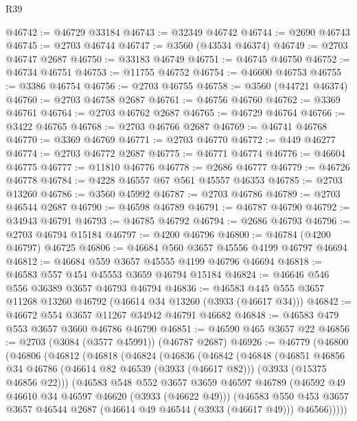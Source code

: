 \begin{lexlean}{R39}
\begin{coremodule}
@46742 := @46729 @33184
@46743 := @32349 @46742
@46744 := @2690 @46743
@46745 := @2703 @46744
@46747 := @3560 (@43534 @46374)
@46749 := @2703 @46747 @2687
@46750 := @33183 @46749
@46751 := @46745 @46750
@46752 := @46734 @46751
@46753 := @11755 @46752
@46754 := @46600 @46753
@46755 := @3386 @46754
@46756 := @2703 @46755
@46758 := @3560 (@44721 @46374)
@46760 := @2703 @46758 @2687
@46761 := @46756 @46760
@46762 := @3369 @46761
@46764 := @2703 @46762 @2687
@46765 := @46729 @46764
@46766 := @3422 @46765
@46768 := @2703 @46766 @2687
@46769 := @46741 @46768
@46770 := @3369 @46769
@46771 := @2703 @46770
@46772 := @449 @46277
@46774 := @2703 @46772 @2687
@46775 := @46771 @46774
@46776 := @46604 @46775
@46777 := @11810 @46776
@46778 := @2686 @46777
@46779 := @46726 @46778
@46784 := @4228 @46557 @67 @561 @45557 @46353
@46785 := @2703 @13260
@46786 := @3560 @45992
@46787 := @2703 @46786
@46789 := @2703 @46544 @2687
@46790 := @46598 @46789
@46791 := @46787 @46790
@46792 := @34943 @46791
@46793 := @46785 @46792
@46794 := @2686 @46793
@46796 := @2703 @46794 @15184
@46797 := @4200 @46796
@46800 := @46784 (@4200 @46797) @46725
@46806 := @46684 @560 @3657 @45556 @4199 @46797 @46694
@46812 := @46684 @559 @3657 @45555 @4199 @46796 @46694
@46818 := @46583 @557 @454 @45553 @3659 @46794 @15184
@46824 := @46646 @546 @556 @36389 @3657 @46793 @46794
@46836 := @46583 @445 @555 @3657 @11268 @13260 @46792 (@46614 @34 @13260 (@3933 (@46617 @34)))
@46842 := @46672 @554 @3657 @11267 @34942 @46791 @46682
@46848 := @46583 @479 @553 @3657 @3660 @46786 @46790
@46851 := @46590 @465 @3657 @22
@46856 := @2703 (@3084 (@3577 @45991)) (@46787 @2687)
@46926 := @46779
    (@46800
      (@46806
        (@46812
          (@46818
            (@46824
              (@46836
                (@46842
                  (@46848
                    (@46851
                      @46856
                      @34
                      @46786
                      (@46614 @82 @46539 (@3933 (@46617 @82)))
                      (@3933 (@15375 @46856 @22)))
                    (@46583
                      @548
                      @552
                      @3657
                      @3659
                      @46597
                      @46789
                      (@46592 @49 @46610 @34 @46597 @46620 (@3933 (@46622 @49)))
                      (@46583
                        @550
                        @453
                        @3657
                        @3657
                        @46544
                        @2687
                        (@46614 @49 @46544 (@3933 (@46617 @49)))
                        @46566)))))

\end{coremodule}
\end{lexlean}
